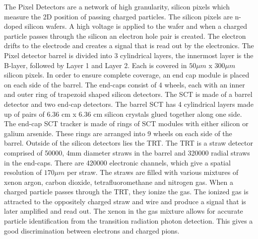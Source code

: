 \indent The Pixel Detectors are a network of high granularity, silicon pixels which measure the 2D position of passing charged particles. The silicon pixels are n-doped silicon wafers. A high voltage is applied to the wafer and when a charged particle passes through the silicon an electron hole pair is created. The electron drifts to the electrode and creates a signal that is read out by the electronics.  The Pixel detector barrel is divided into 3 cylindrical layers, the innermost layer is the B-layer, followed by Layer 1 and Layer 2. Each is covered in ${50\mu{m}}$ x ${300\mu{m}}$ silicon pixels. In order to ensure complete coverage, an end cap module is placed on each side of the barrel. The end-caps consist of 4 wheels, each with an inner and outer ring of trapezoid shaped silicon detectors. \linebreak
\indent The SCT is made of a barrel detector and two end-cap detectors. The barrel SCT has 4 cylindrical layers made up of pairs of 6.36 cm x 6.36 cm silicon crystals glued together along one side. The end-cap SCT tracker is made of rings of SCT modules with either silicon or galium arsenide. These rings are arranged into 9 wheels on each side of the barrel.\linebreak
\indent Outside of the silicon detectors lies the TRT. The TRT is a straw detector comprised of 50000, 4mm diameter straws in the barrel and 320000 radial straws in the end-caps. There are 420000 electronic channels, which give a spatial resolution of ${170\mu{m}}$ per straw. The straws are filled with various mixtures of xenon argon, carbon dioxide, tetrafluoromethane and nitrogen gas. When a charged particle passes through the TRT, they ionize the gas. The ionized gas is attracted to the oppositely charged straw and wire and produce a signal that is later amplified and read out. The xenon in the gas mixture allows for accurate particle identification from the transition radiation photon detection.  This gives a good discrimination between electrons and charged pions.

